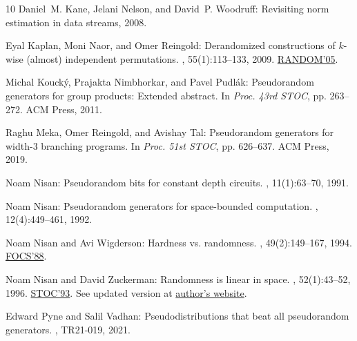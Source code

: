 \begin{thebibliography}{10}
{\sc Daniel~M. Kane, Jelani Nelson, and David~P. Woodruff}: Revisiting norm
  estimation in data streams, 2008.

{\sc Eyal Kaplan, Moni Naor, and Omer Reingold}: Derandomized constructions of
  $k$-wise (almost) independent permutations.
, 55(1):113--133, 2009.
\newblock \prelim \href{https://doi.org/10.1007/11538462\_30}{RANDOM'05}.
\newblock [\epfmtdoi{10.1007/s00453-008-9267-y}]

{\sc Michal Kouck{\'y}, Prajakta Nimbhorkar, and Pavel Pudl{\'a}k}:
  Pseudorandom generators for group products: {E}xtended abstract.
\newblock In {\em Proc. 43rd STOC}, pp. 263--272. ACM Press, 2011.
\newblock [\epfmtdoi{10.1145/1993636.1993672}]

{\sc Raghu Meka, Omer Reingold, and Avishay Tal}: Pseudorandom generators for
  width-3 branching programs.
\newblock In {\em Proc. 51st STOC}, pp. 626--637. ACM Press, 2019.
\newblock [\epfmtdoi{10.1145/3313276.3316319}]

{\sc Noam Nisan}: Pseudorandom bits for constant depth circuits.
, 11(1):63--70, 1991.
\newblock [\epfmtdoi{10.1007/BF01375474}]

{\sc Noam Nisan}: Pseudorandom generators for space-bounded computation.
, 12(4):449--461, 1992.
\newblock [\epfmtdoi{10.1007/bf01305237}]

{\sc Noam Nisan and Avi Wigderson}: Hardness vs. randomness.
, 49(2):149--167, 1994.
\newblock \prelim \href{https://doi.org/10.1109/SFCS.1988.21916}{FOCS'88}.
\newblock [\epfmtdoi{10.1016/S0022-0000(05)80043-1}]

{\sc Noam Nisan and David Zuckerman}: Randomness is linear in space.
, 52(1):43--52, 1996.
\newblock \prelim \href{https://doi.org/10.1145/167088.167162}{STOC'93}. See
  updated version at
  \href{https://www.cs.utexas.edu/~diz/Sub\%20Websites/Research/Randomness\_is\_linear\_in\_space.pdf}{author's
  website}.

{\sc Edward Pyne and Salil Vadhan}: Pseudodistributions that beat all
  pseudorandom generators.
, TR21-019, 2021.


\end{thebibliography}
